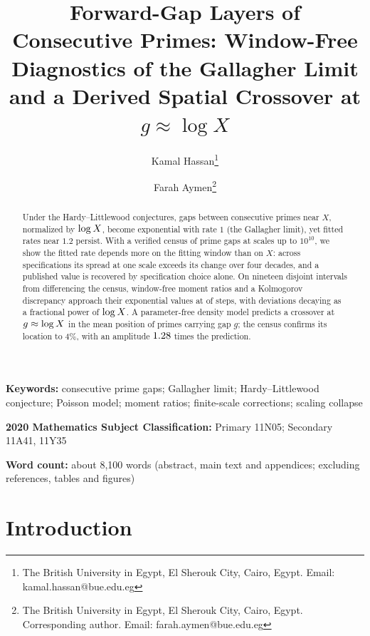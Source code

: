 \documentclass[11pt,a4paper]{article}
\begin{document}
\title{Forward-Gap Layers of Consecutive Primes: Window-Free Diagnostics of the Gallagher Limit and a Derived Spatial Crossover at $g \approx \log X$}

\author{Kamal Hassan\thanks{The British University in Egypt, El Sherouk City, Cairo, Egypt. Email: kamal.hassan@bue.edu.eg}
\and Farah Aymen\thanks{The British University in Egypt, El Sherouk City, Cairo, Egypt. Corresponding author. Email: farah.aymen@bue.edu.eg}}

\date{}

\maketitle

\begin{abstract}
Under the Hardy--Littlewood conjectures, gaps between consecutive primes near $X$, normalized by $\log X$, become exponential with rate $1$ (the Gallagher limit), yet fitted rates near $1.2$ persist. With a verified census of prime gaps at \nScales{} scales up to $10^{10}$, we show the fitted rate depends more on the fitting window than on $X$: across \nSpecs{} specifications its spread at one scale exceeds its change over four decades, and a published value is recovered by specification choice alone. On nineteen disjoint intervals from differencing the census, window-free moment ratios and a Kolmogorov discrepancy approach their exponential values at \towardEtwo{} of \nSteps{} steps, with deviations decaying as a fractional power of $\log X$. A parameter-free density model predicts a crossover at $g\approx\log X$ in the mean position of primes carrying gap $g$; the census confirms its location to $4\%$, with an amplitude $1.28$ times the prediction.
\end{abstract}

\noindent\textbf{Keywords:} consecutive prime gaps; Gallagher limit; Hardy--Littlewood conjecture; Poisson model; moment ratios; finite-scale corrections; scaling collapse

\noindent\textbf{2020 Mathematics Subject Classification:} Primary 11N05; Secondary 11A41, 11Y35

\noindent\textbf{Word count:} about 8{,}100 words (abstract, main text and appendices; excluding references, tables and figures)

\section{Introduction}
\end{document}
